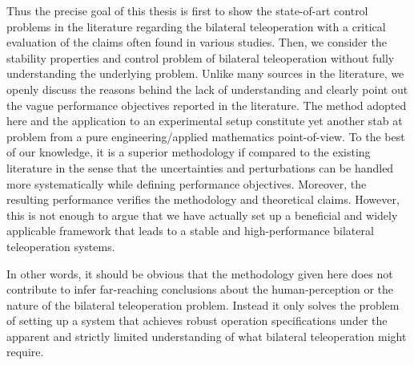 Thus the precise goal of this thesis is first to show the state-of-art control problems in the literature regarding the bilateral 
teleoperation with a critical evaluation of the claims often found in various studies. Then, we consider the stability properties and 
control problem of bilateral teleoperation without fully understanding the underlying problem. Unlike many sources in the literature, we 
openly discuss the reasons behind the lack of understanding and clearly point out the vague performance objectives reported in the 
literature. The method adopted here and the application to an experimental setup constitute yet another stab at problem from a pure 
engineering/applied mathematics point-of-view. To the best of our knowledge, it is a superior methodology if compared to the existing 
literature in the sense that the uncertainties and perturbations can be handled more systematically while defining performance objectives. 
Moreover, the resulting performance verifies the methodology and theoretical claims. However, this is not enough to argue that we have 
actually set up a beneficial and widely applicable framework that leads to a stable and high-performance bilateral teleoperation systems. 

In other words, it should be obvious that the methodology given here does not contribute to infer far-reaching conclusions about the 
human-perception or the nature of the bilateral teleoperation problem. Instead it only solves the problem of setting up a system that 
achieves robust operation specifications under the apparent and strictly limited understanding of what bilateral teleoperation might require. 
